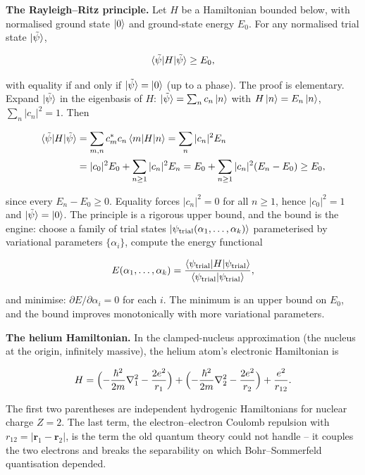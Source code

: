 \medskip\noindent\textbf{The Rayleigh--Ritz principle.}
Let $H$ be a Hamiltonian bounded below, with normalised ground state $\ket{0}$ and ground-state energy $E_{0}$. For any normalised trial state $\ket{\tilde\psi}$,
\begin{linenomath}
\begin{equation}
\braket{\tilde\psi|H|\tilde\psi} \ge E_{0},
\label{eq:rayleigh-ritz}
\end{equation}
\end{linenomath}
with equality if and only if $\ket{\tilde\psi} = \ket{0}$ (up to a phase). The proof is elementary. Expand $\ket{\tilde\psi}$ in the eigenbasis of $H$: $\ket{\tilde\psi} = \sum_{n} c_{n}\ket{n}$ with $H\ket{n}=E_{n}\ket{n}$, $\sum_{n}|c_{n}|^{2}=1$. Then
\begin{linenomath}
\begin{align*}
\braket{\tilde\psi|H|\tilde\psi} &= \sum_{m,n} c_{m}^{*}c_{n}\braket{m|H|n}
= \sum_{n}|c_{n}|^{2}E_{n} \\
&= |c_{0}|^{2}E_{0} + \sum_{n\geq 1}|c_{n}|^{2}E_{n}
= E_{0} + \sum_{n\geq 1}|c_{n}|^{2}(E_{n}-E_{0}) \ge E_{0},
\end{align*}
\end{linenomath}
since every $E_{n}-E_{0} \ge 0$. Equality forces $|c_{n}|^{2}=0$ for all $n\geq 1$, hence $|c_{0}|^{2}=1$ and $\ket{\tilde\psi}=\ket{0}$. The principle is a rigorous upper bound, and the bound is the engine: choose a family of trial states $\ket{\psi_{\text{trial}}(\alpha_{1},\ldots,\alpha_{k})}$ parameterised by variational parameters $\{\alpha_{i}\}$, compute the energy functional
\begin{linenomath}
\begin{equation*}
E(\alpha_{1},\ldots,\alpha_{k}) = \frac{\braket{\psi_{\text{trial}}|H|\psi_{\text{trial}}}}{\braket{\psi_{\text{trial}}|\psi_{\text{trial}}}},
\end{equation*}
\end{linenomath}
and minimise: $\partial E/\partial\alpha_{i}=0$ for each $i$. The minimum is an upper bound on $E_{0}$, and the bound improves monotonically with more variational parameters.

\medskip\noindent\textbf{The helium Hamiltonian.}
In the clamped-nucleus approximation (the nucleus at the origin, infinitely massive), the helium atom's electronic Hamiltonian is
\begin{linenomath}
\begin{equation}
H = \Bigl(-\frac{\hbar^{2}}{2m}\nabla_{1}^{2} - \frac{2e^{2}}{r_{1}}\Bigr)
+ \Bigl(-\frac{\hbar^{2}}{2m}\nabla_{2}^{2} - \frac{2e^{2}}{r_{2}}\Bigr)
+ \frac{e^{2}}{r_{12}}.
\label{eq:helium-hamiltonian}
\end{equation}
\end{linenomath}
The first two parentheses are independent hydrogenic Hamiltonians for nuclear charge $Z=2$. The last term, the electron--electron Coulomb repulsion with $r_{12} = |\bm r_{1} - \bm r_{2}|$, is the term the old quantum theory could not handle -- it couples the two electrons and breaks the separability on which Bohr--Sommerfeld quantisation depended.

